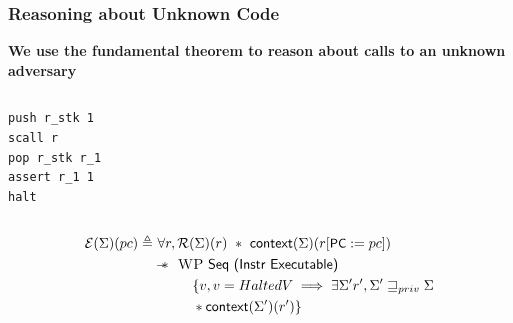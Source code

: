 \documentclass{beamer}
\newcommand{\sep}{-\kern-.6em\raisebox{-.659ex}{*}\ }
\newcommand{\interp}[2]{(#1)(#2)}
\begin{document}
\begin{frame}[fragile]
\frametitle{Reasoning about Unknown Code}
\textbf{We use the fundamental theorem to reason about calls to an unknown adversary}

\begin{columns}[c]


\begin{center}
\begin{lstlisting}
push r_stk 1
scall r 
pop r_stk r_1
assert r_1 1
halt
\end{lstlisting}
\end{center}

\end{columns}

\begin{align*}
 		\mathcal{E}\interp{\Sigma}{pc} \triangleq&~\forall r, \mathcal{R}(\Sigma)(r) ~*~{\textsf{context}(\Sigma)(r[\textsf{\small PC}:=pc])}\\
 		&\sep~\textsc{WP}~\textsf{Seq (Instr Executable)}~\\
 		&\hspace{1cm}\{ v, v = HaltedV \implies \exists \Sigma ' r', \Sigma ' \sqsupseteq_{priv} \Sigma \\
 		&\hspace{1cm}* {\textsf{context}(\Sigma ')(r')}\}
 	\end{align*}

\end{frame}
\end{document}
